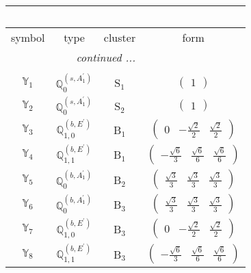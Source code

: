 \documentclass[fleqn,10pt,landscape]{article}
\begin{document}
\begin{itemize}
\begin{center}
\begin{longtable}{c|c|c|c}
\multicolumn{3}{l}{\tablename\ \thetable{}} \\
 \hline \hline
symbol & type & cluster & form \\ \hline \endhead

 \hline \hline
\multicolumn{3}{r}{\footnotesize\it continued ...} \\ \endfoot

 \hline \hline
\multicolumn{3}{r}{} \\ \endlastfoot

$ \mathbb{Y}_{1} $ & $\mathbb{Q}_{0}^{(s,A_{1}^{\prime})}$ & S$_{1}$ & $\begin{pmatrix} 1 \end{pmatrix}$ \\ \hline
$ \mathbb{Y}_{2} $ & $\mathbb{Q}_{0}^{(s,A_{1}^{\prime})}$ & S$_{2}$ & $\begin{pmatrix} 1 \end{pmatrix}$ \\ \hline
$ \mathbb{Y}_{3} $ & $\mathbb{Q}_{1,0}^{(b,E^{\prime})}$ & B$_{1}$ & $\begin{pmatrix} 0 & - \frac{\sqrt{2}}{2} & \frac{\sqrt{2}}{2} \end{pmatrix}$ \\
$ \mathbb{Y}_{4} $ & $\mathbb{Q}_{1,1}^{(b,E^{\prime})}$ & B$_{1}$ & $\begin{pmatrix} - \frac{\sqrt{6}}{3} & \frac{\sqrt{6}}{6} & \frac{\sqrt{6}}{6} \end{pmatrix}$ \\ \hline
$ \mathbb{Y}_{5} $ & $\mathbb{Q}_{0}^{(b,A_{1}^{\prime})}$ & B$_{2}$ & $\begin{pmatrix} \frac{\sqrt{3}}{3} & \frac{\sqrt{3}}{3} & \frac{\sqrt{3}}{3} \end{pmatrix}$ \\ \hline
$ \mathbb{Y}_{6} $ & $\mathbb{Q}_{0}^{(b,A_{1}^{\prime})}$ & B$_{3}$ & $\begin{pmatrix} \frac{\sqrt{3}}{3} & \frac{\sqrt{3}}{3} & \frac{\sqrt{3}}{3} \end{pmatrix}$ \\
$ \mathbb{Y}_{7} $ & $\mathbb{Q}_{1,0}^{(b,E^{\prime})}$ & B$_{3}$ & $\begin{pmatrix} 0 & - \frac{\sqrt{2}}{2} & \frac{\sqrt{2}}{2} \end{pmatrix}$ \\
$ \mathbb{Y}_{8} $ & $\mathbb{Q}_{1,1}^{(b,E^{\prime})}$ & B$_{3}$ & $\begin{pmatrix} - \frac{\sqrt{6}}{3} & \frac{\sqrt{6}}{6} & \frac{\sqrt{6}}{6} \end{pmatrix}$ \\

\end{longtable}
\end{center}
\end{itemize}
\end{document}
